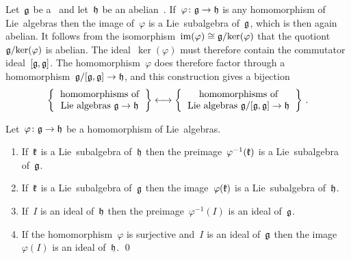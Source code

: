 \begin{example}
  Let~$\mathfrak{g}$ be a~\liealgebra{$\kf$} and let~$\mathfrak{h}$ be an abelian~\liealgebra{$\kf$}.
  If~$\varphi \colon \glie \to \hlie$ is any homomorphism of Lie~algebras then the image of~$\varphi$ is a Lie~subalgebra of~$\mathfrak{g}$, which is then again abelian.
  It follows from the isomorphism~$\operatorname{im}(\varphi) \cong \mathfrak{g} / {\ker(\varphi)}$ that the quotiont~$\mathfrak{g} / {\ker(\varphi)}$ is abelian.
  The ideal~$\ker(\varphi)$ must therefore contain the commutator ideal~$[\mathfrak{g}, \mathfrak{g}]$.
  The homomorphism~$\varphi$ does therefore factor through a homomorphism~$\glie / [\glie, \glie] \to \hlie$, and this construction gives a bijection
  \[
    \left\{
      \begin{tabular}{c}
        homomorphisms of \\
        Lie~algebras~$\glie \to \hlie$
      \end{tabular}
    \right\}
    \onetoone
    \left\{
      \begin{tabular}{c}
        homomorphisms of \\
        Lie~algebras $\glie/[\glie, \glie] \to \hlie$
      \end{tabular}
    \right\} \,.
  \]
\end{example}




\begin{lemma}
  Let~$\varphi \colon \glie \to \hlie$ be a homomorphism of Lie~algebras.
  \begin{enumerate}
    \item
      If~$\mathfrak{k}$ is a Lie~subalgebra of~$\mathfrak{h}$ then the preimage~$\varphi^{-1}(\mathfrak{k})$ is a Lie~subalgebra of~$\mathfrak{g}$.
    \item
      If~$\mathfrak{k}$ is a Lie~subalgebra of~$\mathfrak{g}$ then the image~$\varphi(\mathfrak{k})$ is a Lie~subalgebra of~$\mathfrak{h}$.
    \item
      If~$I$ is an ideal of~$\mathfrak{h}$ then the preimage~$\varphi^{-1}(I)$ is an ideal of~$\mathfrak{g}$.
    \item
      If the homomorphism~$\varphi$ is surjective and~$I$ is an ideal of~$\mathfrak{g}$ then the image~$\varphi(I)$ is an ideal of~$\mathfrak{h}$.
    \qed
  \end{enumerate}
\end{lemma}


